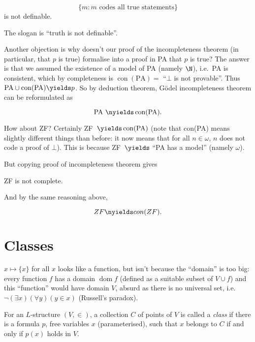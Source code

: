 \documentclass[a4paper]{article}
\DeclareMathOperator{\dom}{dom} %
\begin{document}
\begin{theorem}
  \[
    \{m: m \text{ codes all true statements}\}
  \]
  is not definable.
\end{theorem}

The slogan is ``truth is not definable''.

Another objection is why doesn't our proof of the incompleteness theorem (in particular, that \(p\) is true) formalise into a proof in PA that \(p\) is true? The answer is that we assumed the existence of a model of PA (namely \(\N\)), i.e.\ PA is consistent, which by completeness is \(\operatorname{con}(\text{PA}) = \) ``\(\bot\) is not provable''. Thus \(\text{PA} \cup \operatorname{con}(\text{PA}) \yields p\). So by deduction theorem, Gödel incompleteness theorem can be reformulated as

\begin{theorem}
  \[
    \text{PA }\nyields \operatorname{con}(\text{PA}).
  \]
\end{theorem}

How about ZF? Certainly ZF~\(\yields \operatorname{con}(\text{PA})\) (note that con(PA) means slightly different things than before: it now means that for all \(n \in \omega\), \(n\) does not code a proof of \(\bot\)). This is because ZF~\(\yields\) ``PA has a model'' (namely \(\omega\)).

But copying proof of incompleteness theorem gives

\begin{theorem}
  ZF is not complete.
\end{theorem}

And by the same reasoning above,

\begin{theorem}
  \[
    ZF \nyields con(ZF).
  \]
\end{theorem}

\appendix

\section{Classes}
\label{sec:classes}

\(x \mapsto \{x\}\) for all \(x\) looks like a function, but isn't because the ``domain'' is too big: every function \(f\) has a domain \(\dom f\) (defined as a suitable subset of \(V \cup f\)) and this ``function'' would have domain \(V\), absurd as there is no universal set, i.e.\ \(\neg (\exists x) (\forall y) (y \in x)\) (Russell's paradox).

\begin{definition}[Class]
  For an \(L\)-structure \((V, \in)\), a collection \(C\) of points of \(V\) is called a \emph{class} if there is a formula \(p\), free variables \(x\) (parameterised), such that \(x\) belongs to \(C\) if and only if \(p(x)\) holds in \(V\).
\end{definition}
\end{document}

